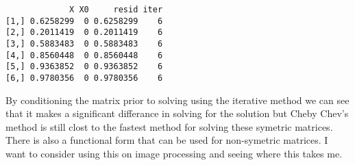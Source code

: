 \documentclass[]{article}
\begin{document}
\begin{verbatim}
             X X0     resid iter
[1,] 0.6258299  0 0.6258299    6
[2,] 0.2011419  0 0.2011419    6
[3,] 0.5883483  0 0.5883483    6
[4,] 0.8560448  0 0.8560448    6
[5,] 0.9363852  0 0.9363852    6
[6,] 0.9780356  0 0.9780356    6
\end{verbatim}

By conditioning the matrix prior to solving using the iterative method
we can see that it makes a significant differance in solving for the
solution but Cheby Chev's method is still clost to the fastest method
for solving these symetric matrices. There is also a functional form
that can be used for non-symetric matrices. I want to consider using
this on image processing and seeing where this takes me.
\end{document}
